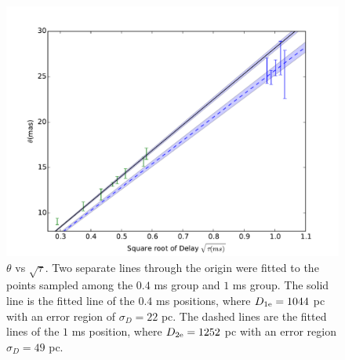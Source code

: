 \documentclass[useAMS,usenatbib]{mn2e}
\begin{document}
\begin{figure}
\centering
\includegraphics[width=1.0\linewidth, angle=0]{Theta_tau.pdf}
\caption{${\theta}$ vs ${\sqrt{\tau}}$. Two separate lines through the
  origin were fitted to the points sampled among the $0.4$ ms group
  and $1$ ms group. The solid line is the fitted line of the $0.4$ ms
  positions, where $D_{1\rm e}=1044$ pc with an error region of
  $\sigma_D=22$ pc. The dashed lines are the fitted lines of the $1$ ms
  position, where $D_{2\rm e}=1252$ pc with an error region
  $\sigma_D=49$ pc.
}
\label{thetatau}
\end{figure}
\end{document}
